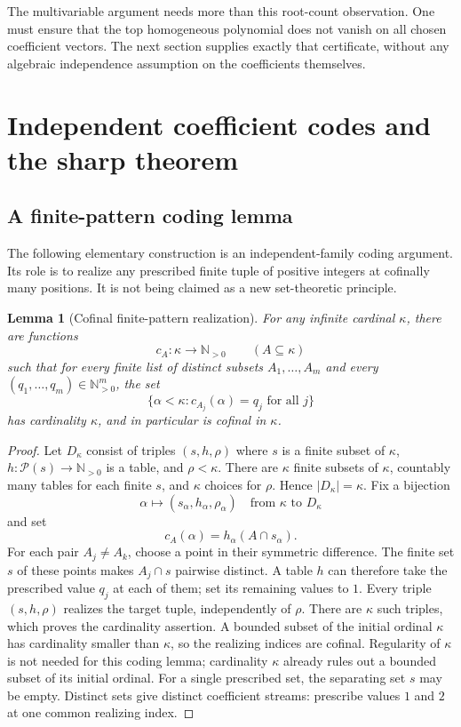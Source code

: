 \documentclass[11pt,letterpaper]{article}
\newtheorem{lemma}[theorem]{Lemma}
\theoremstyle{definition}
\theoremstyle{remark}
\newcommand{\N}{\mathbb N}
\begin{document}
The multivariable argument needs more than this root-count observation.
One must ensure that the top homogeneous polynomial does not vanish on all
chosen coefficient vectors. The next section supplies exactly that
certificate, without any algebraic independence assumption on the
coefficients themselves.

\section{Independent coefficient codes and the sharp theorem}\label{bst:sec:independence}

\subsection{A finite-pattern coding lemma}

The following elementary construction is an independent-family coding
argument. Its role is to realize any prescribed finite tuple of positive
integers at cofinally many positions. It is not being claimed as a new
set-theoretic principle.

\begin{lemma}[Cofinal finite-pattern realization]\label{bst:lem:coding}
For any infinite cardinal $\kappa$, there are functions
\[
 c_A:\kappa\longrightarrow\N_{>0}\qquad(A\subseteq\kappa)
\]
such that for every finite list of distinct subsets $A_1,\ldots,A_m$ and
every $(q_1,\ldots,q_m)\in\N_{>0}^m$, the set
\[
 \{\alpha<\kappa:c_{A_j}(\alpha)=q_j\text{ for all }j\}
\]
has cardinality $\kappa$, and in particular is cofinal in $\kappa$.
\end{lemma}
\begin{proof}
Let $D_\kappa$ consist of triples $(s,h,\rho)$ where $s$ is a finite subset
of $\kappa$, $h:\mathcal P(s)\to\N_{>0}$ is a table, and $\rho<\kappa$.
There are $\kappa$ finite subsets of $\kappa$, countably many tables for
each finite $s$, and $\kappa$ choices for $\rho$. Hence
$|D_\kappa|=\kappa$. Fix a bijection
\[
 \alpha\longmapsto(s_\alpha,h_\alpha,\rho_\alpha)
 \quad\text{from }\kappa\text{ to }D_\kappa
\]
and set
\begin{equation}\label{bst:eq:code}
 c_A(\alpha)=h_\alpha(A\cap s_\alpha).
\end{equation}
For each pair $A_j\ne A_k$, choose a point in their symmetric difference.
The finite set $s$ of these points makes $A_j\cap s$ pairwise distinct.
A table $h$ can therefore take the prescribed value $q_j$ at each of them;
set its remaining values to $1$. Every triple $(s,h,\rho)$ realizes the
target tuple, independently of $\rho$. There are $\kappa$ such triples,
which proves the cardinality assertion. A bounded subset of the initial
ordinal $\kappa$ has cardinality smaller than $\kappa$, so the realizing
indices are cofinal. Regularity of $\kappa$ is not needed for this
coding lemma; cardinality $\kappa$ already rules out a bounded subset
of its initial ordinal. For a single prescribed set, the separating set
$s$ may be empty. Distinct sets give distinct coefficient streams: prescribe
values $1$ and $2$ at one common realizing index.
\end{proof}
\end{document}
